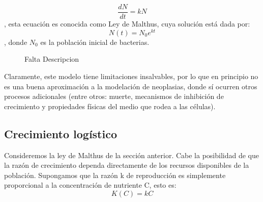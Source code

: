\begin{equation}
    \frac{dN}{dt} = kN
\end{equation}
, esta ecuaci\'on es conocida como Ley de Malthus, cuya soluci\'on est\'a dada por:
\begin{equation}
    N(t) = N_{0}e^{kt}
\end{equation}
, donde $N_{0}$ es la poblaci\'on inicial de bacterias.

\begin{figure}[!ht]
\begin{center}
\end{center}\vspace*{-0.6cm}
\caption[Imagen de Oncogenes. Falta poner leyenda]{Falta Descripcion}
\label{fig-malthus}
\end{figure}

Claramente, este modelo tiene limitaciones insalvables, por lo que en principio no es una buena aproximación a la modelación de neoplasias, donde sí ocurren otros procesos adicionales (entre otros: muerte, mecanismos de inhibición de crecimiento y propiedades físicas del medio que rodea a las células).

\subsection{Crecimiento logístico}
Consideremos la ley de Malthus de la sección anterior. Cabe la posibilidad de que la razón de crecimiento dependa directamente de los recursos disponibles de la población. Supongamos que la razón k de reproducción es simplemente proporcional a la concentración de nutriente C, esto es:
\begin{equation}
    K(C) = kC
\end{equation}

